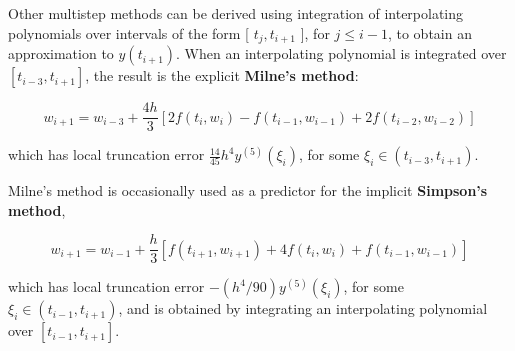 %
%

Other multistep methods can be derived using integration of interpolating polynomials over intervals of the form [ $t_{j}, t_{i+1}$ ], for $j \leq i-1$, to obtain an approximation to $y\left(t_{i+1}\right)$. When an interpolating polynomial is integrated over $\left[t_{i-3}, t_{i+1}\right]$, the result is the explicit {\bf Milne's method}:

$$
w_{i+1}=w_{i-3}+\frac{4 h}{3}\left[2 f\left(t_{i}, w_{i}\right)-f\left(t_{i-1}, w_{i-1}\right)+2 f\left(t_{i-2}, w_{i-2}\right)\right]
$$

which has local truncation error $\frac{14}{45} h^{4} y^{(5)}\left(\xi_{i}\right)$, for some $\xi_{i} \in\left(t_{i-3}, t_{i+1}\right)$.

Milne's method is occasionally used as a predictor for the implicit {\bf Simpson's method},

$$
w_{i+1}=w_{i-1}+\frac{h}{3}\left[f\left(t_{i+1}, w_{i+1}\right)+4 f\left(t_{i}, w_{i}\right)+f\left(t_{i-1}, w_{i-1}\right)\right]
$$

which has local truncation error $-\left(h^{4} / 90\right) y^{(5)}\left(\xi_{i}\right)$, for some $\xi_{i} \in\left(t_{i-1}, t_{i+1}\right)$, and is obtained by integrating an interpolating polynomial over $\left[t_{i-1}, t_{i+1}\right]$.

